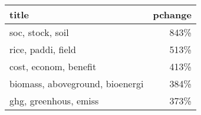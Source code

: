 \begin{tabular}{p{1.2cm}r}
\toprule
                           title &  pchange \\
\midrule
                soc, stock, soil &     843\% \\
              rice, paddi, field &     513\% \\
           cost, econom, benefit &     413\% \\
 biomass, aboveground, bioenergi &     384\% \\
           ghg, greenhous, emiss &     373\% \\
\bottomrule
\end{tabular}
